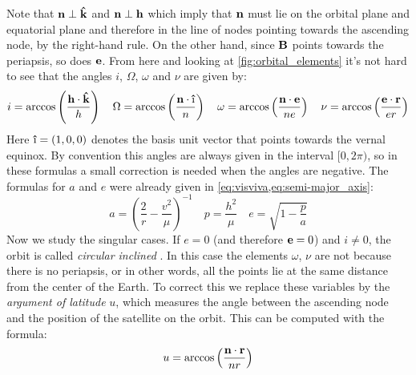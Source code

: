 \documentclass[../main.tex]{subfiles}
\begin{document}
Note that $\boldsymbol{\mathrm{n}}\perp \boldsymbol{\mathrm{\hat{k}}}$ and $\boldsymbol{\mathrm{n}}\perp \boldsymbol{\mathrm{h}}$ which imply that $\boldsymbol{\mathrm{n}}$ must lie on the orbital plane and equatorial plane and therefore in the line of nodes pointing towards the ascending node, by the right-hand rule. On the other hand, since $\boldsymbol{\mathrm{B}}$ points towards the periapsis, so does $\boldsymbol{\mathrm{e}}$. From here and looking at \cref{fig:orbital_elements} it's not hard to see that the angles $i$, $\Omega$, $\omega$ and $\nu$ are given by:
\begin{equation}
  i=\arccos\left(\frac{\vf{h}\cdot \vf{\hat{k}}}{h}\right)\quad \Omega=\arccos\left(\frac{\vf{n}\cdot \vf{\hat{\text\i}}}{n}\right)\quad \omega=\arccos\left(\frac{\vf{n}\cdot \vf{e}}{ne}\right)\quad \nu=\arccos\left(\frac{\vf{e}\cdot \vf{r}}{er}\right)
\end{equation}
Here $\vf{\hat{\text\i}}=(1,0,0)$ denotes the basis unit vector that points towards the vernal equinox. By convention this angles are always given in the interval $[0,2\pi)$, so in these formulas a small correction is needed when the angles are negative. The formulas for $a$ and $e$ were already given in \cref{eq:visviva,eq:semi-major_axis}:
\begin{equation}
  a = {\left(\frac{2}{r}-\frac{v^2}{\mu}\right)}^{-1}\quad p=\frac{h^2}{\mu} \quad e  = \sqrt{1-\frac{p}{a}}
\end{equation}
Now we study the singular cases. If $e=0$ (and therefore $\boldsymbol{\mathrm{e}}=0$) and $i\ne 0$, the orbit is called \emph{circular inclined} \cite{vallado}. In this case the elements $\omega$, $\nu$ are not because there is no periapsis, or in other words, all the points lie at the same distance from the center of the Earth. To correct this we replace these variables by the \emph{argument of latitude} $u$, which measures the angle between the ascending node and the position of the satellite on the orbit. This can be computed with the formula:
\begin{equation}
  u=\arccos\left(\frac{\boldsymbol{\mathrm{n}}\cdot \boldsymbol{\mathrm{r}}}{nr}\right)
\end{equation}
\end{document}
